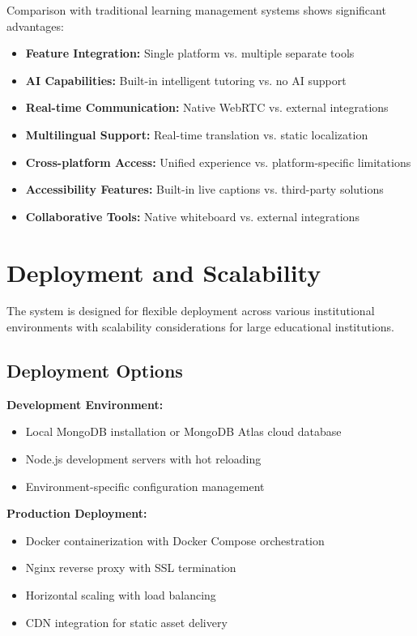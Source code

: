 \documentclass[onecolumn]{IEEEtran}
\begin{document}
Comparison with traditional learning management systems shows significant advantages:

\begin{itemize}
\item \textbf{Feature Integration:} Single platform vs. multiple separate tools
\item \textbf{AI Capabilities:} Built-in intelligent tutoring vs. no AI support
\item \textbf{Real-time Communication:} Native WebRTC vs. external integrations
\item \textbf{Multilingual Support:} Real-time translation vs. static localization
\item \textbf{Cross-platform Access:} Unified experience vs. platform-specific limitations
\item \textbf{Accessibility Features:} Built-in live captions vs. third-party solutions
\item \textbf{Collaborative Tools:} Native whiteboard vs. external integrations
\end{itemize}

\section{Deployment and Scalability}

The system is designed for flexible deployment across various institutional environments with scalability considerations for large educational institutions.

\subsection{Deployment Options}

\textbf{Development Environment:}
\begin{itemize}
\item Local MongoDB installation or MongoDB Atlas cloud database
\item Node.js development servers with hot reloading
\item Environment-specific configuration management
\end{itemize}

\textbf{Production Deployment:}
\begin{itemize}
\item Docker containerization with Docker Compose orchestration
\item Nginx reverse proxy with SSL termination
\item Horizontal scaling with load balancing
\item CDN integration for static asset delivery
\end{itemize}
\end{document}
